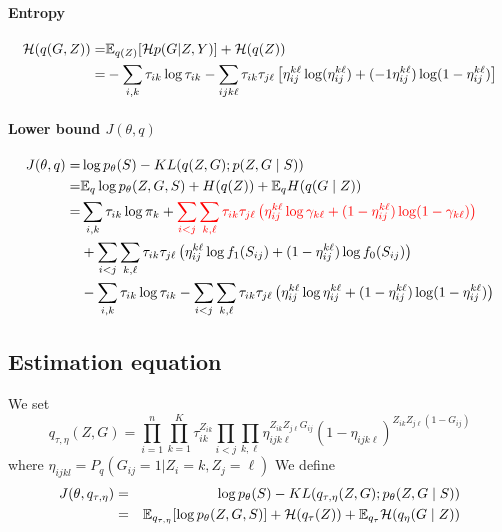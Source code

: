 
\paragraph{Entropy}

\begin{align}\label{eq:entropy}
\mathcal{H}(q(G,Z)) = &   \mathbb E_{q(Z)}[\mathcal{H}p(G| Z,Y)] + \mathcal{H}(q(Z))\\
=&  - \sum_{i,k} \tau_{ik} \log \tau_{ik}  - \sum_{ijk\ell} \tau_{ik} \tau_{j\ell}\left[\eta_{ij}^{k\ell} \log ( \eta_{ij}^{k\ell} ) +   (-1 \eta_{ij}^{k\ell}) \log(1-\eta_{ij}^{k\ell})\right]
\end{align}
\paragraph{Lower bound $J(\theta, q)$}
\begin{align} \label{eq:lowerBound}
 J(\theta, q) 
 = & \log p_\theta(S) - KL(q(Z, G) ; p(Z, G \mid S)) \nonumber \\
 = & \mathbb E_q \log p_\theta(Z, G, S) + H(q(Z))  + \mathbb E_q H(q(G \mid Z)) \\ 
 = & \sum_{i, k} \tau_{ik} \log \pi_k 
 + \textcolor{red}{\sum_{i < j} \sum_{k, \ell} \tau_{ik} \tau_{j\ell} \left(\eta^{k\ell}_{ij} \log \gamma_{k\ell} + (1 - \eta^{k\ell}_{ij}) \log (1 - \gamma_{k\ell})\right)} \nonumber \\
 & + \sum_{i < j} \sum_{k, \ell} \tau_{ik} \tau_{j\ell} \left(\eta^{k\ell}_{ij} \log f_1(S_{ij}) + (1 - \eta^{k\ell}_{ij}) \log f_0(S_{ij})\right) \nonumber \\
 & - \sum_{i, k} \tau_{ik} \log \tau_{ik} - \sum_{i< j} \sum_{k, \ell} \tau_{ik} \tau_{j\ell} \left( \eta^{k\ell}_{ij} \log \eta^{k\ell}_{ij} + (1 - \eta^{k\ell}_{ij}) \log (1 - \eta^{k\ell}_{ij}) \right)
\end{align}





\subsection{Estimation equation}
\color{red}
We set
$$q_{\tau,\eta}(Z,G) = \prod_{i=1}^n \prod_{k=1}^K \tau_{ik}^{Z_{ik}} \prod_{i<j} \prod_{k,\ell} \eta_{ijk\ell}^{Z_{ik}Z_{j\ell}G_{ij}} (1- \eta_{ijk \ell})^{Z_{ik}Z_{j \ell}(1-G_{ij})}$$
where 
$\eta_{ijkl} = P_q(G_{ij}=1 | Z_i = k, Z_j = \ell)$ 
We define   
  \begin{eqnarray*}
  J(\theta,q_{\tau,\eta}) &=&  \log p_\theta(S) - KL(q_{\tau,\eta}(Z, G) ; p_\theta(Z, G \mid S)) \\
  &=&    \mathbb E_{q_{\tau,\eta}}[\log p_\theta(Z, G, S)]+ \mathcal{H}(q_\tau(Z))  + \mathbb E_{q_\tau} \mathcal{H}(q_\eta(G \mid Z))
  \end{eqnarray*}
  
